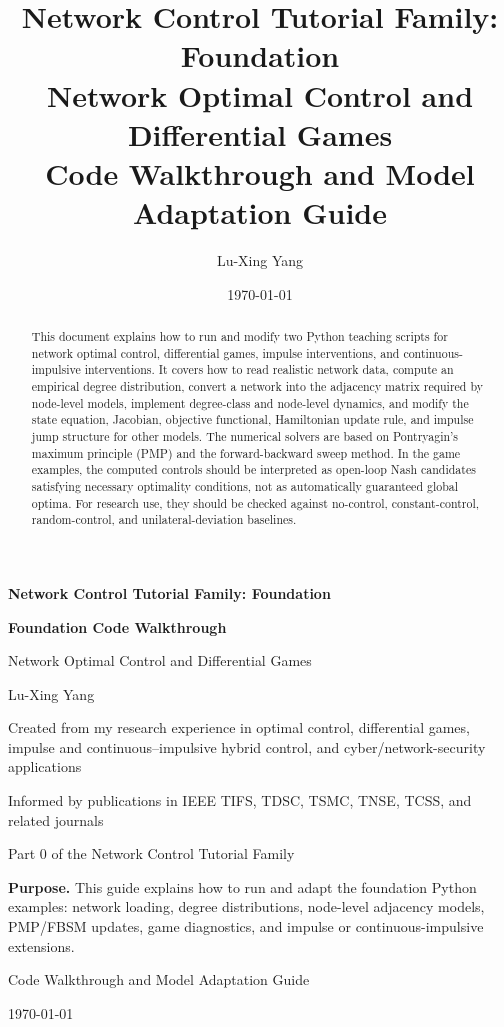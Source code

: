 \documentclass[11pt,a4paper]{article}
\title{\bfseries Network Control Tutorial Family: Foundation\\[1mm]
\large Network Optimal Control and Differential Games\\[2mm]
\large Code Walkthrough and Model Adaptation Guide}
\author{Lu-Xing Yang}
\date{\today}
\begin{document}
\begin{titlepage}
\centering
\vspace*{1.25cm}
{\sffamily\bfseries\Large\color{TutorialBlue} Network Control Tutorial Family: Foundation\par}
\vspace{0.35cm}
{\sffamily\bfseries\Huge\color{TutorialBlue} Foundation Code Walkthrough\par}
\vspace{0.35cm}
{\sffamily\Large Network Optimal Control and Differential Games\par}
\vspace{0.6cm}
{\large Lu-Xing Yang\par}
\vspace{0.55cm}
{\large Created from my research experience in optimal control, differential games, impulse and continuous--impulsive hybrid control, and cyber/network-security applications\par}
\vspace{0.25cm}
{\large Informed by publications in IEEE TIFS, TDSC, TSMC, TNSE, TCSS, and related journals\par}
\vspace{0.25cm}
{\large Part 0 of the Network Control Tutorial Family\par}
\vfill
\begin{tcolorbox}[width=0.86\textwidth,colback=SoftBlue,colframe=TutorialBlue]
\textbf{Purpose.} This guide explains how to run and adapt the foundation Python examples: network loading, degree distributions, node-level adjacency models, PMP/FBSM updates, game diagnostics, and impulse or continuous-impulsive extensions.
\end{tcolorbox}
\vfill
{\large Code Walkthrough and Model Adaptation Guide\par}
\vspace{0.45cm}
{\large \today\par}
\end{titlepage}

\begin{abstract}
This document explains how to run and modify two Python teaching scripts for network optimal control, differential games, impulse interventions, and continuous-impulsive interventions. It covers how to read realistic network data, compute an empirical degree distribution, convert a network into the adjacency matrix required by node-level models, implement degree-class and node-level dynamics, and modify the state equation, Jacobian, objective functional, Hamiltonian update rule, and impulse jump structure for other models. The numerical solvers are based on Pontryagin's maximum principle (PMP) and the forward-backward sweep method. In the game examples, the computed controls should be interpreted as open-loop Nash candidates satisfying necessary optimality conditions, not as automatically guaranteed global optima. For research use, they should be checked against no-control, constant-control, random-control, and unilateral-deviation baselines.
\end{abstract}
\end{document}
